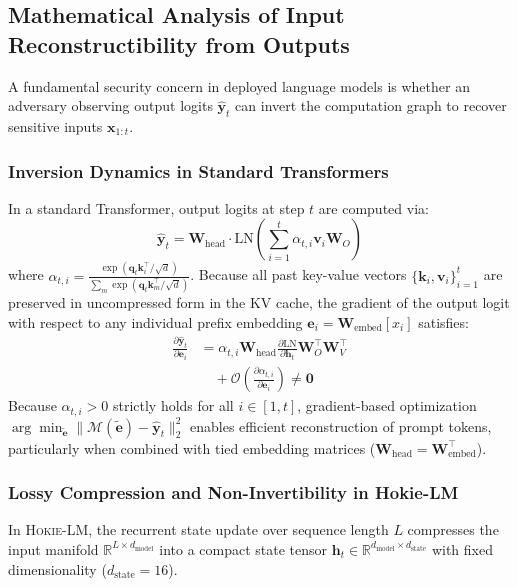 \subsection{Mathematical Analysis of Input Reconstructibility from Outputs}

A fundamental security concern in deployed language models is whether an adversary observing output logits $\hat{\mathbf{y}}_t$ can invert the computation graph to recover sensitive inputs $\mathbf{x}_{1:t}$.

\subsubsection{Inversion Dynamics in Standard Transformers}
In a standard Transformer, output logits at step $t$ are computed via:
\begin{equation}
    \hat{\mathbf{y}}_t = \mathbf{W}_{\mathrm{head}} \cdot \mathrm{LN}\left( \sum_{i=1}^t \alpha_{t,i} \mathbf{v}_i \mathbf{W}_O \right)
\end{equation}
where $\alpha_{t,i} = \frac{\exp(\mathbf{q}_t \mathbf{k}_i^\top / \sqrt{d})}{\sum_m \exp(\mathbf{q}_t \mathbf{k}_m^\top / \sqrt{d})}$. Because all past key-value vectors $\{\mathbf{k}_i, \mathbf{v}_i\}_{i=1}^t$ are preserved in uncompressed form in the KV cache, the gradient of the output logit with respect to any individual prefix embedding $\mathbf{e}_i = \mathbf{W}_{\mathrm{embed}}[x_i]$ satisfies:
\begin{equation}
\begin{split}
    \frac{\partial \hat{\mathbf{y}}_t}{\partial \mathbf{e}_i} &= \alpha_{t,i} \mathbf{W}_{\mathrm{head}} \frac{\partial \mathrm{LN}}{\partial \mathbf{h}_t} \mathbf{W}_O^\top \mathbf{W}_V^\top \\
    &\quad + \mathcal{O}\left( \frac{\partial \alpha_{t,i}}{\partial \mathbf{e}_i} \right) \neq \mathbf{0}
\end{split}
\end{equation}
Because $\alpha_{t,i} > 0$ strictly holds for all $i \in [1, t]$, gradient-based optimization $\arg\min_{\tilde{\mathbf{e}}} \|\mathcal{M}(\tilde{\mathbf{e}}) - \hat{\mathbf{y}}_t\|_2^2$ enables efficient reconstruction of prompt tokens, particularly when combined with tied embedding matrices ($\mathbf{W}_{\mathrm{head}} = \mathbf{W}_{\mathrm{embed}}^\top$).

\subsubsection{Lossy Compression and Non-Invertibility in Hokie-LM}
In \textsc{Hokie-LM}, the recurrent state update over sequence length $L$ compresses the input manifold $\mathbb{R}^{L \times d_{\mathrm{model}}}$ into a compact state tensor $\mathbf{h}_t \in \mathbb{R}^{d_{\mathrm{model}} \times d_{\mathrm{state}}}$ with fixed dimensionality ($d_{\mathrm{state}} = 16$).

